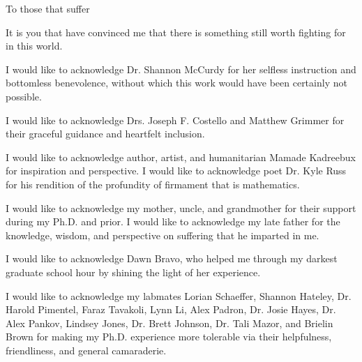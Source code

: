 \documentclass{ucbthesis}
\begin{document}


\maketitle
\copyrightpage



\begin{frontmatter}

\begin{dedication}
\null\vfil
\begin{center}
To those that suffer\\\vspace{12pt}

It is you that have convinced me that there is something still worth
fighting for in this world.

\end{center}
\vfil\null
\end{dedication}


\tableofcontents
\clearpage
\listoffigures
\clearpage
\listoftables

\begin{acknowledgements}

I would like to acknowledge Dr. Shannon McCurdy for her 
selfless instruction and bottomless benevolence, without which this
work would have been certainly not possible.

I would like to acknowledge Drs. Joseph F. Costello and Matthew
Grimmer for their graceful guidance and heartfelt inclusion. 

I would like to acknowledge author, artist, and humanitarian Mamade
Kadreebux for inspiration and perspective. I would like to acknowledge
poet Dr. Kyle Russ for his rendition of the profundity of firmament
that is mathematics.

I would like to acknowledge my mother, uncle, and grandmother for
their support during my Ph.D. and prior. I would like to acknowledge
my late father for the knowledge, wisdom, and perspective on suffering
that he imparted in me.

I would like to acknowledge Dawn Bravo, who helped me through my
darkest graduate school hour by shining the light of her experience. 
  
I would like to acknowledge my labmates Lorian
Schaeffer, Shannon Hateley, Dr. Harold Pimentel, Faraz Tavakoli, Lynn
Li, Alex Padron, Dr. Josie Hayes, Dr. Alex Pankov, Lindsey Jones,
Dr. Brett Johnson, Dr. Tali Mazor, and Brielin Brown for making my Ph.D. experience more
tolerable via their helpfulness, friendliness, and general
camaraderie.


\end{acknowledgements}
\end{frontmatter}
\end{document}
